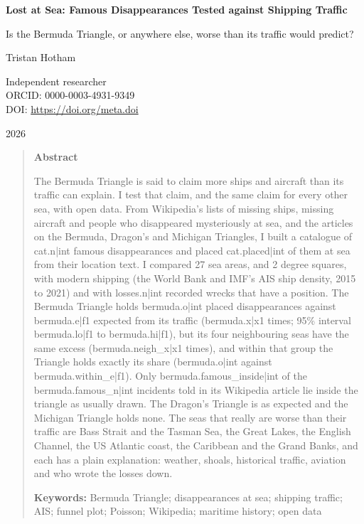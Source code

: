 \documentclass[11pt,a4paper]{article}
\begin{document}
\begin{center}
{\Large\bfseries Lost at Sea: Famous Disappearances Tested against Shipping Traffic\par}
\vspace{0.4em}
{\large Is the Bermuda Triangle, or anywhere else, worse than its traffic would predict?\par}
\vspace{1.2em}
{\large Tristan Hotham\par}
\vspace{0.3em}
{\small Independent researcher\\
ORCID: 0000-0003-4931-9349\\
DOI: \href{https://doi.org/{{meta.doi}}}{https://doi.org/{{meta.doi}}}\par}
\vspace{0.8em}
2026
\end{center}

\begin{quote}
\small
\begin{center}\textbf{Abstract}\end{center}
The Bermuda Triangle is said to claim more ships and aircraft than its traffic can explain. I test that claim, and the same claim for every other sea, with open data. From Wikipedia's lists of missing ships, missing aircraft and people who disappeared mysteriously at sea, and the articles on the Bermuda, Dragon's and Michigan Triangles, I built a catalogue of {{cat.n|int}} famous disappearances and placed {{cat.placed|int}} of them at sea from their location text. I compared 27 sea areas, and 2 degree squares, with modern shipping (the World Bank and IMF's AIS ship density, 2015 to 2021) and with {{losses.n|int}} recorded wrecks that have a position. The Bermuda Triangle holds {{bermuda.o|int}} placed disappearances against {{bermuda.e|f1}} expected from its traffic ({{bermuda.x|x1}} times; 95\% interval {{bermuda.lo|f1}} to {{bermuda.hi|f1}}), but its four neighbouring seas have the same excess ({{bermuda.neigh_x|x1}} times), and within that group the Triangle holds exactly its share ({{bermuda.o|int}} against {{bermuda.within_e|f1}}). Only {{bermuda.famous_inside|int}} of the {{bermuda.famous_n|int}} incidents told in its Wikipedia article lie inside the triangle as usually drawn. The Dragon's Triangle is as expected and the Michigan Triangle holds none. The seas that really are worse than their traffic are Bass Strait and the Tasman Sea, the Great Lakes, the English Channel, the US Atlantic coast, the Caribbean and the Grand Banks, and each has a plain explanation: weather, shoals, historical traffic, aviation and who wrote the losses down.

\textbf{Keywords:} Bermuda Triangle; disappearances at sea; shipping traffic; AIS; funnel plot; Poisson; Wikipedia; maritime history; open data
\end{quote}
\end{document}
